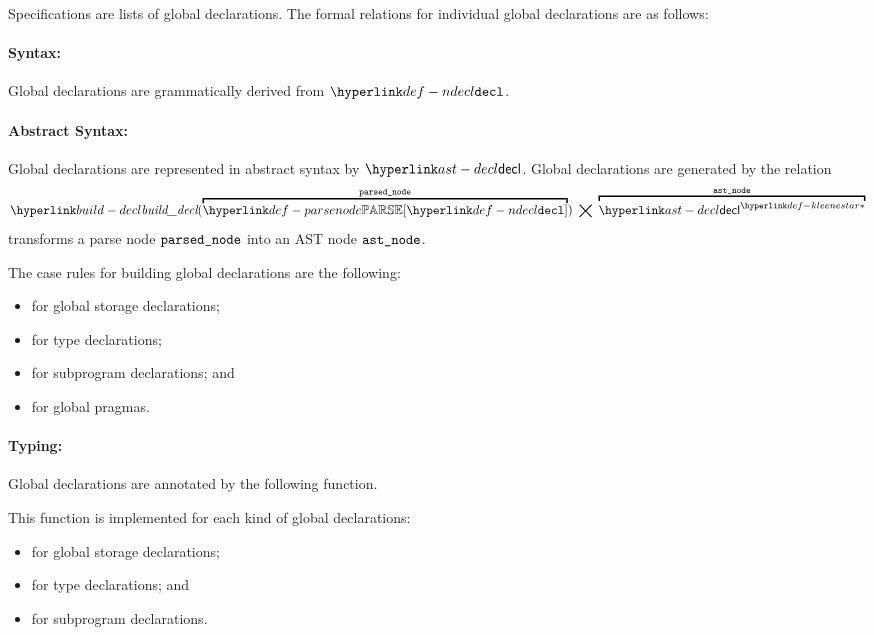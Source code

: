 Specifications are lists of global declarations.
The formal relations for individual global declarations are as follows:

\paragraph{Syntax:} Global declarations are grammatically derived from $\Ndecl$.

\paragraph{Abstract Syntax:} Global declarations are represented in abstract syntax by $\decl$.
Global declarations are generated by the relation
\hypertarget{build-decl}{}
\[
  \builddecl(\overname{\parsenode{\Ndecl}}{\vparsednode}) \;\aslrel\; \overname{\KleeneStar{\decl}}{\vastnode}
\]
transforms a parse node $\texttt{parsed\_node}$ into an AST node $\texttt{ast\_node}$.

The case rules for building global declarations are the following:
\begin{itemize}
  \item {} for global storage declarations;
  \item {} for type declarations;
  \item {} for subprogram declarations; and
  \item {} for global pragmas.
\end{itemize}

\paragraph{Typing:} Global declarations are annotated by the following function.

  This function is implemented for each kind of global declarations:
\begin{itemize}
  \item {} for global storage declarations;
  \item {} for type declarations; and
  \item {} for subprogram declarations.
\end{itemize}

